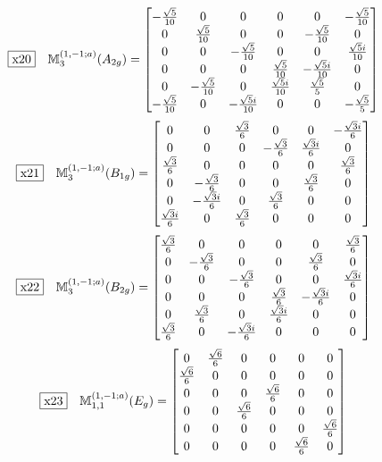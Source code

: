 \documentclass[fleqn,10pt,landscape]{jsarticle}
\begin{document}
\begin{dmath*}
\fbox{x20}\quad \mathbb{M}_{3}^{(1,-1;a)}(A_{2g})=\begin{bmatrix} - \frac{\sqrt{5}}{10} & 0 & 0 & 0 & 0 & - \frac{\sqrt{5}}{10} \\ 0 & \frac{\sqrt{5}}{10} & 0 & 0 & - \frac{\sqrt{5}}{10} & 0 \\ 0 & 0 & - \frac{\sqrt{5}}{10} & 0 & 0 & \frac{\sqrt{5} i}{10} \\ 0 & 0 & 0 & \frac{\sqrt{5}}{10} & - \frac{\sqrt{5} i}{10} & 0 \\ 0 & - \frac{\sqrt{5}}{10} & 0 & \frac{\sqrt{5} i}{10} & \frac{\sqrt{5}}{5} & 0 \\ - \frac{\sqrt{5}}{10} & 0 & - \frac{\sqrt{5} i}{10} & 0 & 0 & - \frac{\sqrt{5}}{5} \end{bmatrix}
\end{dmath*}
\begin{dmath*}
\fbox{x21}\quad \mathbb{M}_{3}^{(1,-1;a)}(B_{1g})=\begin{bmatrix} 0 & 0 & \frac{\sqrt{3}}{6} & 0 & 0 & - \frac{\sqrt{3} i}{6} \\ 0 & 0 & 0 & - \frac{\sqrt{3}}{6} & \frac{\sqrt{3} i}{6} & 0 \\ \frac{\sqrt{3}}{6} & 0 & 0 & 0 & 0 & \frac{\sqrt{3}}{6} \\ 0 & - \frac{\sqrt{3}}{6} & 0 & 0 & \frac{\sqrt{3}}{6} & 0 \\ 0 & - \frac{\sqrt{3} i}{6} & 0 & \frac{\sqrt{3}}{6} & 0 & 0 \\ \frac{\sqrt{3} i}{6} & 0 & \frac{\sqrt{3}}{6} & 0 & 0 & 0 \end{bmatrix}
\end{dmath*}
\begin{dmath*}
\fbox{x22}\quad \mathbb{M}_{3}^{(1,-1;a)}(B_{2g})=\begin{bmatrix} \frac{\sqrt{3}}{6} & 0 & 0 & 0 & 0 & \frac{\sqrt{3}}{6} \\ 0 & - \frac{\sqrt{3}}{6} & 0 & 0 & \frac{\sqrt{3}}{6} & 0 \\ 0 & 0 & - \frac{\sqrt{3}}{6} & 0 & 0 & \frac{\sqrt{3} i}{6} \\ 0 & 0 & 0 & \frac{\sqrt{3}}{6} & - \frac{\sqrt{3} i}{6} & 0 \\ 0 & \frac{\sqrt{3}}{6} & 0 & \frac{\sqrt{3} i}{6} & 0 & 0 \\ \frac{\sqrt{3}}{6} & 0 & - \frac{\sqrt{3} i}{6} & 0 & 0 & 0 \end{bmatrix}
\end{dmath*}
\begin{dmath*}
\fbox{x23}\quad \mathbb{M}_{1,1}^{(1,-1;a)}(E_{g})=\begin{bmatrix} 0 & \frac{\sqrt{6}}{6} & 0 & 0 & 0 & 0 \\ \frac{\sqrt{6}}{6} & 0 & 0 & 0 & 0 & 0 \\ 0 & 0 & 0 & \frac{\sqrt{6}}{6} & 0 & 0 \\ 0 & 0 & \frac{\sqrt{6}}{6} & 0 & 0 & 0 \\ 0 & 0 & 0 & 0 & 0 & \frac{\sqrt{6}}{6} \\ 0 & 0 & 0 & 0 & \frac{\sqrt{6}}{6} & 0 \end{bmatrix}
\end{dmath*}
\end{document}
